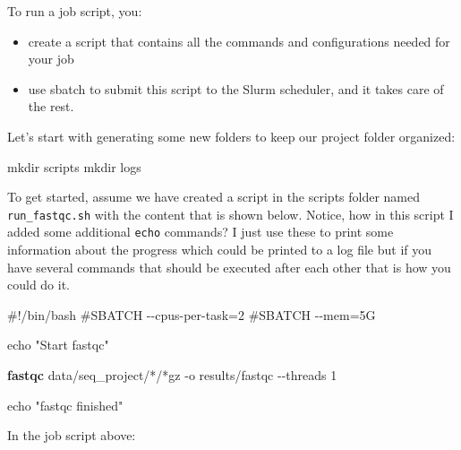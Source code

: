 \documentclass[
  letterpaper,
  DIV=11,
  numbers=noendperiod]{scrreprt}
\newenvironment{Shaded}{}{}
\newcommand{\AttributeTok}[1]{\textcolor[rgb]{0.84,0.23,0.29}{#1}}
\newcommand{\BuiltInTok}[1]{\textcolor[rgb]{0.84,0.23,0.29}{#1}}
\newcommand{\CommentTok}[1]{\textcolor[rgb]{0.42,0.45,0.49}{#1}}
\newcommand{\ExtensionTok}[1]{\textcolor[rgb]{0.84,0.23,0.29}{\textbf{#1}}}
\newcommand{\FunctionTok}[1]{\textcolor[rgb]{0.44,0.26,0.76}{#1}}
\newcommand{\NormalTok}[1]{\textcolor[rgb]{0.14,0.16,0.18}{#1}}
\newcommand{\PreprocessorTok}[1]{\textcolor[rgb]{0.84,0.23,0.29}{#1}}
\newcommand{\StringTok}[1]{\textcolor[rgb]{0.01,0.18,0.38}{#1}}
\providecommand{\tightlist}{%
  \setlength{\itemsep}{0pt}\setlength{\parskip}{0pt}}\usepackage{longtable,booktabs,array}
\begin{document}
To run a job script, you:

\begin{itemize}
\tightlist
\item
  create a script that contains all the commands and configurations
  needed for your job
\item
  use sbatch to submit this script to the Slurm scheduler, and it takes
  care of the rest.
\end{itemize}

Let's start with generating some new folders to keep our project folder
organized:

\begin{Shaded}
\begin{Highlighting}[]
\FunctionTok{mkdir}\NormalTok{ scripts }
\FunctionTok{mkdir}\NormalTok{ logs}
\end{Highlighting}
\end{Shaded}

To get started, assume we have created a script in the scripts folder
named \texttt{run\_fastqc.sh} with the content that is shown below.
Notice, how in this script I added some additional \texttt{echo}
commands? I just use these to print some information about the progress
which could be printed to a log file but if you have several commands
that should be executed after each other that is how you could do it.

\begin{Shaded}
\begin{Highlighting}[]
\CommentTok{\#!/bin/bash}
\CommentTok{\#SBATCH {-}{-}cpus{-}per{-}task=2}
\CommentTok{\#SBATCH {-}{-}mem=5G}

\BuiltInTok{echo} \StringTok{"Start fastqc"}

\ExtensionTok{fastqc}\NormalTok{ data/seq\_project/}\PreprocessorTok{*}\NormalTok{/}\PreprocessorTok{*}\NormalTok{gz }\AttributeTok{{-}o}\NormalTok{ results/fastqc  }\AttributeTok{{-}{-}threads}\NormalTok{ 1}

\BuiltInTok{echo} \StringTok{"fastqc finished"}
\end{Highlighting}
\end{Shaded}

In the job script above:
\end{document}
